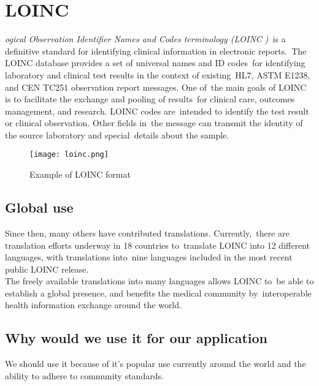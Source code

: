   \section[Logical Observation Identifier Names and Codes terminology\
  (LOINC\textsuperscript{\textregistered})] 
  {LOINC\textsuperscript{\textregistered}}
  \label{sec:loinc}
  
  \textit{ogical Observation Identifier Names and Codes terminology (LOINC )}\
 is a definitive standard for identifying clinical information in electronic reports.\
The LOINC database provides a set of universal names and ID codes\ 
for identifying laboratory and clinical test results in the context of existing\
 HL7, ASTM E1238, and CEN TC251 observation report messages. One of\
 the main goals of LOINC is to facilitate the exchange and pooling of results\
 for clinical care, outcomes management, and research. LOINC codes are\
 intended to identify the test result or clinical observation. Other fields in\
 the message can transmit the identity of the source laboratory and special\
details about the sample.\citep{_Vreeman_2013}\

 \begin{figure}[ht!]
    \centering
    \texttt{[image: loinc.png]}
    \caption{Example of LOINC format\citep{_loinc_manual_2013}}
    \label{fig:loinc}
  \end{figure}  

\subsection{Global use}

Since then, many others have contributed translations. Currently,\
there are translation efforts underway in 18 countries to\
translate LOINC into 12 different languages, with translations into\
nine languages included in the most recent public LOINC release.\\

The freely available translations into many languages allows LOINC to\
be able to establish a global presence, and benefits the medical community by\
interoperable health information exchange around the world.\citep{vreeman_enabling_2012}\

 \subsection{Why would we use it for our application}

We should use it because of it's popular use currently around the world and the ability to adhere to community standards.\\

